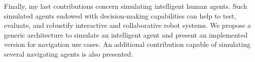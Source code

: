 Finally, my last contributions concern simulating intelligent human agents. Such simulated agents endowed with decision-making capabilities can help to test, evaluate, and robustify interactive and collaborative robot systems. We propose a generic architecture to simulate an intelligent agent and present an implemented version for navigation use cases. An additional contribution capable of simulating several navigating agents is also presented.  
